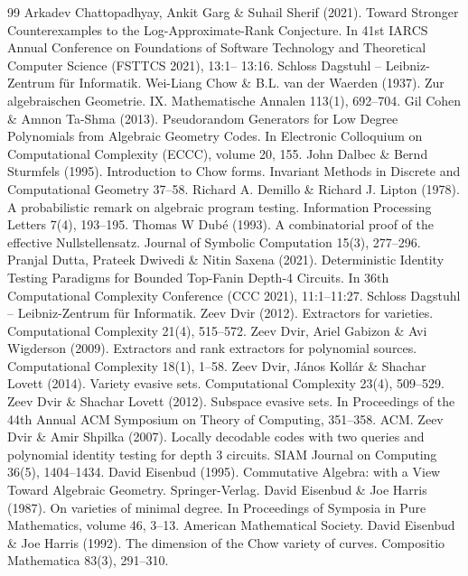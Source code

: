 \documentclass[10pt,a4paper]{article}
\begin{document}
\begin{thebibliography}{99}
 Arkadev Chattopadhyay, Ankit Garg \& Suhail Sherif (2021). Toward Stronger Counterexamples to the Log-Approximate-Rank Conjecture. In 41st IARCS Annual Conference on Foundations of Software Technology and Theoretical Computer Science (FSTTCS 2021), 13:1– 13:16. Schloss Dagstuhl – Leibniz-Zentrum für Informatik.
 Wei-Liang Chow \& B.L. van der Waerden (1937). Zur algebraischen Geometrie. IX. Mathematische Annalen 113(1), 692–704.
 Gil Cohen \& Amnon Ta-Shma (2013). Pseudorandom Generators for Low Degree Polynomials from Algebraic Geometry Codes. In Electronic Colloquium on Computational Complexity (ECCC), volume 20, 155.
 John Dalbec \& Bernd Sturmfels (1995). Introduction to Chow forms. Invariant Methods in Discrete and Computational Geometry 37–58.
 Richard A. Demillo \& Richard J. Lipton (1978). A probabilistic remark on algebraic program testing. Information Processing Letters 7(4), 193–195.
 Thomas W Dubé (1993). A combinatorial proof of the effective Nullstellensatz. Journal of Symbolic Computation 15(3), 277–296.
 Pranjal Dutta, Prateek Dwivedi \& Nitin Saxena (2021). Deterministic Identity Testing Paradigms for Bounded Top-Fanin Depth-4 Circuits. In 36th Computational Complexity Conference (CCC 2021), 11:1–11:27. Schloss Dagstuhl – Leibniz-Zentrum für Informatik.
 Zeev Dvir (2012). Extractors for varieties. Computational Complexity 21(4), 515–572.
 Zeev Dvir, Ariel Gabizon \& Avi Wigderson (2009). Extractors and rank extractors for polynomial sources. Computational Complexity 18(1), 1–58.
 Zeev Dvir, János Kollár \& Shachar Lovett (2014). Variety evasive sets. Computational Complexity 23(4), 509–529.
 Zeev Dvir \& Shachar Lovett (2012). Subspace evasive sets. In Proceedings of the 44th Annual ACM Symposium on Theory of Computing, 351–358. ACM.
 Zeev Dvir \& Amir Shpilka (2007). Locally decodable codes with two queries and polynomial identity testing for depth 3 circuits. SIAM Journal on Computing 36(5), 1404–1434.
 David Eisenbud (1995). Commutative Algebra: with a View Toward Algebraic Geometry. Springer-Verlag.
 David Eisenbud \& Joe Harris (1987). On varieties of minimal degree. In Proceedings of Symposia in Pure Mathematics, volume 46, 3–13. American Mathematical Society.
 David Eisenbud \& Joe Harris (1992). The dimension of the Chow variety of curves. Compositio Mathematica 83(3), 291–310.

\end{thebibliography}
\end{document}
